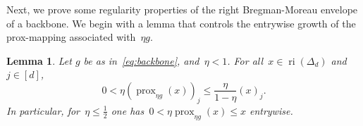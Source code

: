 \documentclass[11pt]{article}
\numberwithin{equation}{section}
\let\le\leqslant
\newtheorem{lemma}[theorem]{Lemma}
\theoremstyle{remark}
\newcommand{\odima}[1]{{\color{magenta}#1}}
\newcommand{\ri}{\operatorname{ri}}
\newcommand{\supp}{\operatorname{supp}}
\newcommand{\Env}{S}
\let\Div\relax\newcommand{\Div}{D_h}
\newcommand{\Simp}{\Delta_d}
\newcommand{\prox}{\operatorname{prox}}
\DeclareMathOperator*{\argmin}{\arg\!\min}
\newcommand{\1}{\mathbf{1}}
\begin{document}
%
%
Next, we prove some regularity properties of the right Bregman-Moreau envelope of a backbone.
We begin with a lemma that controls the entrywise growth of the prox-mapping associated with~$\eta g$.

\begin{lemma}
\label{lem:entry-growth}
Let $g$ be as in~\eqref{eq:backbone}, and~$\eta < 1$. 
For all~$x\in\ri(\Simp)$ and~$j \in [d]$, 
\begin{equation}
\label{eq:entry-growth}
0 < \eta (\prox_{\eta g}(x))_j 
\le \frac{\eta}{1-\eta} (x)_j.
\end{equation}
In particular, for~$\eta \le \frac{1}{2}$ one has~$0 < \eta \prox_{\eta g}(x) \le x$ entrywise.
\end{lemma}

\end{document}

